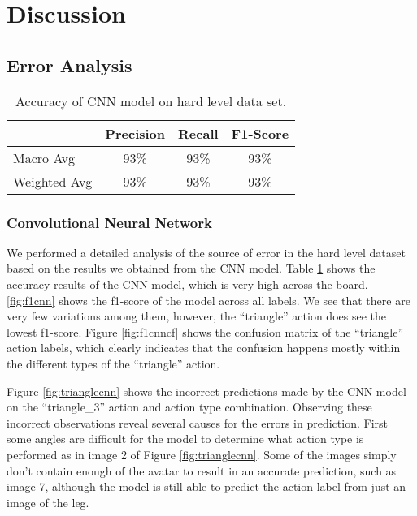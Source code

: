 \documentclass[
	a4paper, %
	10pt, %
	unnumberedsections, %
	twoside, %
]{t0004}
\begin{document}
\section{Discussion}

\subsection{Error Analysis}

\begin{table} %
	\caption{Accuracy of CNN model on hard level data set.}
	\centering
	\begin{tabular}{lccc}
		\toprule
		 & Precision & Recall & F1-Score \\
		\midrule
		Macro Avg & 93\% & 93\% & 93\% \\
		Weighted Avg & 93\% & 93\% & 93\% \\
		\bottomrule
	\end{tabular}
	\label{tab:accuracycnn}
\end{table}

\subsubsection{Convolutional Neural Network} We performed a detailed analysis of the source of error in the hard level dataset based on the results we obtained from the CNN model. Table \ref{tab:accuracycnn} shows the accuracy results of the CNN model, which is very high across the board. \ref{fig:f1cnn} shows the f1-score of the model across all labels. We see that there are very few variations among them, however, the ``triangle'' action does see the lowest f1-score. Figure \ref{fig:f1cnncf} shows the confusion matrix of the ``triangle'' action labels, which clearly indicates that the confusion happens mostly within the different types of the ``triangle'' action.

Figure \ref{fig:trianglecnn} shows the incorrect predictions made by the CNN model on the ``triangle\_3'' action and action type combination. Observing these incorrect observations reveal several causes for the errors in prediction. First some angles are difficult for the model to determine what action type is performed as in image 2 of Figure \ref{fig:trianglecnn}. Some of the images simply don't contain enough of the avatar to result in an accurate prediction, such as image 7, although the model is still able to predict the action label from just an image of the leg.
\end{document}
